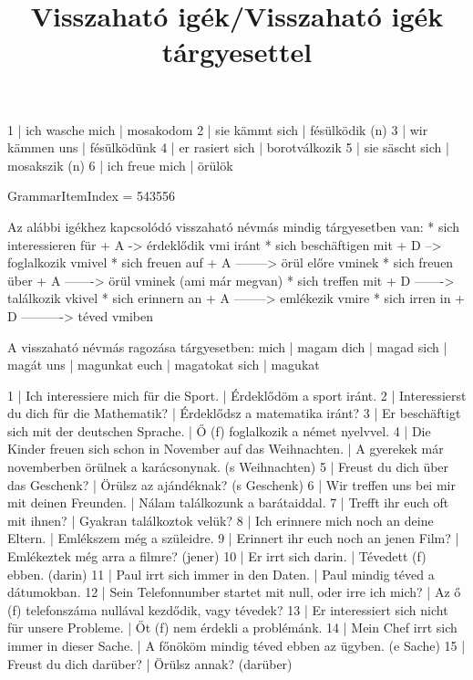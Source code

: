 \begin{exmp}
1 | ich wasche mich | mosakodom
2 | sie kämmt sich | fésülködik (n)
3 | wir kämmen uns | fésülködünk
4 | er rasiert sich | borotválkozik
5 | sie säscht sich | mosakszik (n)
6 | ich freue mich | örülök
\end{exmp}

\title{Visszaható igék/Visszaható igék tárgyesettel}

GrammarItemIndex = 543556

\begin{desc}
Az alábbi igékhez kapcsolódó visszaható névmás mindig tárgyesetben van:
* sich interessieren für + A -> érdeklődik vmi iránt
* sich beschäftigen mit + D --> foglalkozik vmivel
* sich freuen auf + A --------> örül előre vminek
* sich freuen über + A -------> örül vminek (ami már megvan)
* sich treffen mit + D -------> találkozik vkivel
* sich erinnern an + A --------> emlékezik vmire
* sich irren in + D ----------> téved vmiben

A visszaható névmás ragozása tárgyesetben:
mich | magam
dich | magad
sich | magát
uns  | magunkat
euch | magatokat
sich | magukat
\end{desc}

\begin{exmp}
1 | Ich interessiere mich für die Sport. | Érdeklődöm a sport iránt.
2 | Interessierst du dich für die Mathematik? | Érdeklődsz a matematika iránt?
3 | Er beschäftigt sich mit der deutschen Sprache. | Ő (f) foglalkozik a német nyelvvel.
4 | Die Kinder freuen sich schon in November auf das Weihnachten. | A gyerekek már novemberben örülnek a karácsonynak. (s Weihnachten)
5 | Freust du dich über das Geschenk? | Örülsz az ajándéknak? (s Geschenk)
6 | Wir treffen uns bei mir mit deinen Freunden. | Nálam találkozunk a barátaiddal.
7 | Trefft ihr euch oft mit ihnen? | Gyakran találkoztok velük? 
8 | Ich erinnere mich noch an deine Eltern. | Emlékszem még a szüleidre.
9 | Erinnert ihr euch noch an jenen Film? | Emlékeztek még arra a filmre? (jener) 
10 | Er irrt sich darin. | Tévedett (f) ebben. (darin)
11 | Paul irrt sich immer in den Daten. | Paul mindig téved a dátumokban.
12 | Sein Telefonnumber startet mit null, oder irre ich mich? | Az ő (f) telefonszáma nullával kezdődik, vagy tévedek?
13 | Er interessiert sich nicht für unsere Probleme. | Őt (f) nem érdekli a problémánk.
14 | Mein Chef irrt sich immer in dieser Sache. | A főnököm mindig téved ebben az ügyben. (e Sache)
15 | Freust du dich darüber? | Örülsz annak? (darüber)
\end{exmp}

